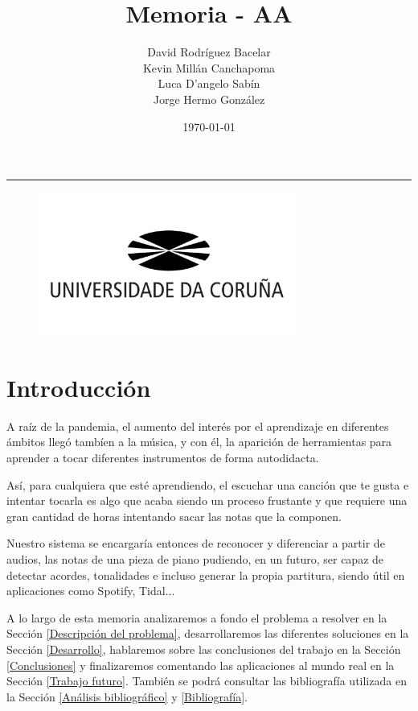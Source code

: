 \documentclass[12pt]{article}
\title{\textbf{\huge Memoria - AA}}
\author{{David Rodríguez Bacelar} \\[0.25cm] {Kevin Millán Canchapoma} \\[0.25cm]{Luca D'angelo Sabín} \\[0.25cm]{Jorge Hermo González}}
\date{\today}
\newcommand{\HRule}{\rule{\linewidth}{0.5mm}}
\begin{document}
\maketitle
\HRule
\bigskip\bigskip\bigskip\bigskip\bigskip\bigskip
\begin{figure}[h!]
	\centering
	\includegraphics[height=180px]{udc.jpg}
	\label{fig:diagram1}
\end{figure}

\newpage

\tableofcontents

\newpage
\section{Introducción}

A raíz de la pandemia, el aumento del interés por el aprendizaje en diferentes ámbitos llegó tambíen a la música, y con él, la aparición
de herramientas para aprender a tocar diferentes instrumentos de forma autodidacta.

\bigskip
Así, para cualquiera que esté aprendiendo, el escuchar una canción que te gusta e intentar tocarla es algo que acaba siendo un proceso
frustante y que requiere una gran cantidad de horas intentando sacar las notas que la componen.

\bigskip
Nuestro sistema se encargaría entonces de reconocer y diferenciar a partir de audios, las notas de una pieza de piano
pudiendo, en un futuro, ser capaz de detectar acordes, tonalidades e incluso generar la propia partitura, siendo útil en aplicaciones como Spotify, Tidal...

\bigskip
A lo largo de esta memoria analizaremos a fondo el problema a resolver en la Sección \ref{Descripción del problema}, desarrollaremos las diferentes soluciones en la
Sección \ref{Desarrollo}, hablaremos sobre las conclusiones del trabajo en la Sección \ref{Conclusiones} y finalizaremos comentando las aplicaciones al mundo
real en la Sección \ref{Trabajo futuro}. También se podrá consultar las bibliografía utilizada en la Sección \ref{Análisis bibliográfico} y \ref{Bibliografía}.
\end{document}
